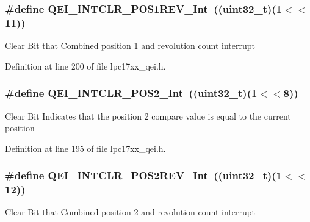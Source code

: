 \hypertarget{group___q_e_i___private___macros_ga0da0a40eae307d4f579a4d81951b8cb9}{
\subsubsection[{\-Q\-E\-I\-\_\-\-I\-N\-T\-C\-L\-R\-\_\-\-P\-O\-S1\-R\-E\-V\-\_\-\-Int}]{\setlength{\rightskip}{0pt plus 5cm}\#define {\bf \-Q\-E\-I\-\_\-\-I\-N\-T\-C\-L\-R\-\_\-\-P\-O\-S1\-R\-E\-V\-\_\-\-Int}~((uint32\-\_\-t)(1$<$$<$11))}}\label{group___q_e_i___private___macros_ga0da0a40eae307d4f579a4d81951b8cb9}
\-Clear \-Bit that \-Combined position 1 and revolution count interrupt 

\-Definition at line 200 of file lpc17xx\-\_\-qei.\-h.

\hypertarget{group___q_e_i___private___macros_ga5aaec5d48de965b2188b0b7fd5f01b3e}{
\subsubsection[{\-Q\-E\-I\-\_\-\-I\-N\-T\-C\-L\-R\-\_\-\-P\-O\-S2\-\_\-\-Int}]{\setlength{\rightskip}{0pt plus 5cm}\#define {\bf \-Q\-E\-I\-\_\-\-I\-N\-T\-C\-L\-R\-\_\-\-P\-O\-S2\-\_\-\-Int}~((uint32\-\_\-t)(1$<$$<$8))}}\label{group___q_e_i___private___macros_ga5aaec5d48de965b2188b0b7fd5f01b3e}
\-Clear \-Bit \-Indicates that the position 2 compare value is equal to the current position 

\-Definition at line 195 of file lpc17xx\-\_\-qei.\-h.

\hypertarget{group___q_e_i___private___macros_gae989566a21b1c32f17be717c83cd399c}{
\subsubsection[{\-Q\-E\-I\-\_\-\-I\-N\-T\-C\-L\-R\-\_\-\-P\-O\-S2\-R\-E\-V\-\_\-\-Int}]{\setlength{\rightskip}{0pt plus 5cm}\#define {\bf \-Q\-E\-I\-\_\-\-I\-N\-T\-C\-L\-R\-\_\-\-P\-O\-S2\-R\-E\-V\-\_\-\-Int}~((uint32\-\_\-t)(1$<$$<$12))}}\label{group___q_e_i___private___macros_gae989566a21b1c32f17be717c83cd399c}
\-Clear \-Bit that \-Combined position 2 and revolution count interrupt 

